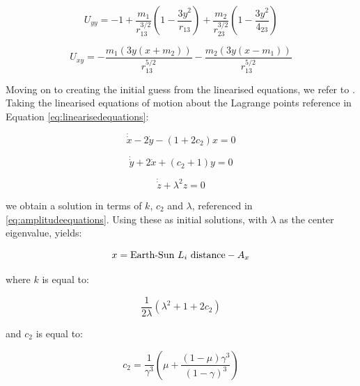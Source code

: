 \begin{equation}
	U_{yy} = -1 + \frac{m_1}{r_{13}^{3/2}} \left(1-\frac{3y^2}{r_{13}}\right) + \frac{m_2}{r_{23}^{3/2}} \left(1-\frac{3y^2}{4_{23}} \right)
\end{equation}

\begin{equation}
	U_{xy} = -\frac{m_1(3y(x+m_2))}{r_{13}^{5/2}} - \frac{m_2(3y(x-m_1))}{r_{13}^{5/2}}
\end{equation}

Moving on to creating the initial guess from the linearised equations, we refer to \citep{Richardson1980}. Taking the linearised equations of motion about the Lagrange points reference in Equation \ref{eq:linearisedequations}:

\begin{equation}
	\dot{\dot{x}} - 2\dot{y} - (1+2c_2)x = 0
\end{equation}

\begin{equation}
	\dot{\dot{y}} + 2\dot{x} + (c_2+1)y = 0
\end{equation}

\begin{equation}
	\dot{\dot{z}} + \lambda ^2 z = 0
\end{equation}

we obtain a solution in terms of $k$, $c_2$ and $\lambda$, referenced in \ref{eq:amplitudeequations}. Using these as initial solutions, with $\lambda$ as the center eigenvalue, yields:

\begin{equation}
	x = \textnormal{Earth-Sun}~L_i~\textnormal{distance} - A_x
\end{equation}

\noindent where $k$ is equal to:

\begin{equation}
	\frac{1}{2\lambda} \left( \lambda^2 + 1 + 2c_2 \right)
\end{equation}



\noindent and $c_2$ is equal to:

\begin{equation}
	c_2 = \frac{1}{\gamma^3} \left( \mu + \frac{\left( 1 - \mu \right)\gamma ^3}{\left( 1 - \gamma \right)^3} \right)
\end{equation}



